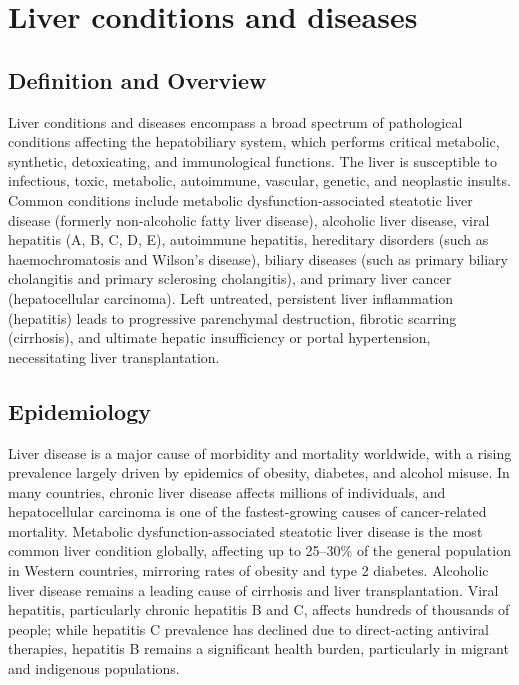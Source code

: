 \chapter{Liver conditions and diseases}

\section*{Definition and Overview}
Liver conditions and diseases encompass a broad spectrum of pathological conditions affecting the hepatobiliary system, which performs critical metabolic, synthetic, detoxicating, and immunological functions. The liver is susceptible to infectious, toxic, metabolic, autoimmune, vascular, genetic, and neoplastic insults. Common conditions include metabolic dysfunction-associated steatotic liver disease (formerly non-alcoholic fatty liver disease), alcoholic liver disease, viral hepatitis (A, B, C, D, E), autoimmune hepatitis, hereditary disorders (such as haemochromatosis and Wilson's disease), biliary diseases (such as primary biliary cholangitis and primary sclerosing cholangitis), and primary liver cancer (hepatocellular carcinoma). Left untreated, persistent liver inflammation (hepatitis) leads to progressive parenchymal destruction, fibrotic scarring (cirrhosis), and ultimate hepatic insufficiency or portal hypertension, necessitating liver transplantation.

\section*{Epidemiology}
Liver disease is a major cause of morbidity and mortality worldwide, with a rising prevalence largely driven by epidemics of obesity, diabetes, and alcohol misuse. In many countries, chronic liver disease affects millions of individuals, and hepatocellular carcinoma is one of the fastest-growing causes of cancer-related mortality. Metabolic dysfunction-associated steatotic liver disease is the most common liver condition globally, affecting up to 25--30\% of the general population in Western countries, mirroring rates of obesity and type 2 diabetes. Alcoholic liver disease remains a leading cause of cirrhosis and liver transplantation. Viral hepatitis, particularly chronic hepatitis B and C, affects hundreds of thousands of people; while hepatitis C prevalence has declined due to direct-acting antiviral therapies, hepatitis B remains a significant health burden, particularly in migrant and indigenous populations.

